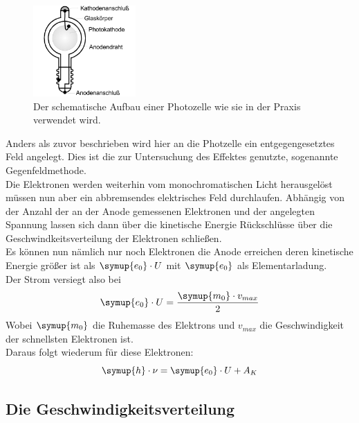    \begin{figure}[H]
        \centering
        \includegraphics[width=0.35\textwidth]{latex/images/Photozelle.PNG}
        \caption{Der schematische Aufbau einer Photozelle wie sie in der Praxis verwendet wird\protect \cite{500}.}
        \label{img:schem}
    \end{figure}
    

    \noindent Anders als zuvor beschrieben wird hier an die Photzelle ein entgegengesetztes Feld angelegt.
    Dies ist die zur Untersuchung des Effektes genutzte, sogenannte Gegenfeldmethode.\\
    Die Elektronen werden weiterhin vom monochromatischen Licht herausgelöst müssen nun aber ein abbremsendes elektrisches Feld durchlaufen.
    Abhängig von der Anzahl der an der Anode gemessenen Elektronen und der angelegten Spannung lassen sich dann über die kinetische Energie 
    Rückschlüsse über die Geschwindkeitsverteilung der Elektronen schließen.\\
    Es können nun nämlich nur noch Elektronen die Anode erreichen deren kinetische Energie größer ist als $\symup{e_0} \cdot U$ mit $\symup{e_0}$ als Elementarladung\cite{e0}.\\
    Der Strom versiegt also bei
    \begin{equation*}
        \symup{e_0} \cdot U= \frac{\symup{m_0}\cdot v_{max}}{2}
    \end{equation*}
    Wobei $\symup{m_0}$ die Ruhemasse des Elektrons \cite{m0} und $v_{max}$ die Geschwindigkeit der schnellsten Elektronen ist.\\
    Daraus folgt wiederum für diese Elektronen:
    \begin{equation}
        \symup{h}\cdot \nu= \symup{e_0} \cdot U + A_K
        \label{eqn:vmax}
    \end{equation}


    \subsection{Die Geschwindigkeitsverteilung}


